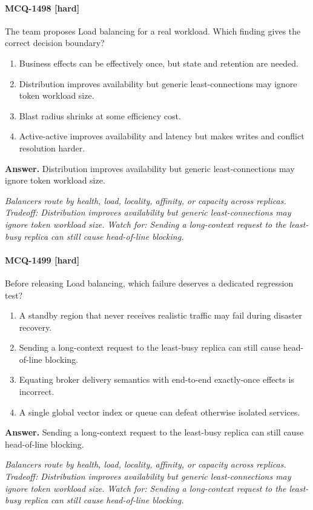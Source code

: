 \paragraph{MCQ-1498 [hard]} The team proposes Load balancing for a real workload. Which finding gives the correct decision boundary?
\begin{enumerate}[label=\Alph*.]
\item Business effects can be effectively once, but state and retention are needed.
\item Distribution improves availability but generic least-connections may ignore token workload size.
\item Blast radius shrinks at some efficiency cost.
\item Active-active improves availability and latency but makes writes and conflict resolution harder.
\end{enumerate}
\noindent\textbf{Answer.} Distribution improves availability but generic least-connections may ignore token workload size.
\par\textit{Balancers route by health, load, locality, affinity, or capacity across replicas. Tradeoff: Distribution improves availability but generic least-connections may ignore token workload size. Watch for: Sending a long-context request to the least-busy replica can still cause head-of-line blocking.}
\paragraph{MCQ-1499 [hard]} Before releasing Load balancing, which failure deserves a dedicated regression test?
\begin{enumerate}[label=\Alph*.]
\item A standby region that never receives realistic traffic may fail during disaster recovery.
\item Sending a long-context request to the least-busy replica can still cause head-of-line blocking.
\item Equating broker delivery semantics with end-to-end exactly-once effects is incorrect.
\item A single global vector index or queue can defeat otherwise isolated services.
\end{enumerate}
\noindent\textbf{Answer.} Sending a long-context request to the least-busy replica can still cause head-of-line blocking.
\par\textit{Balancers route by health, load, locality, affinity, or capacity across replicas. Tradeoff: Distribution improves availability but generic least-connections may ignore token workload size. Watch for: Sending a long-context request to the least-busy replica can still cause head-of-line blocking.}
